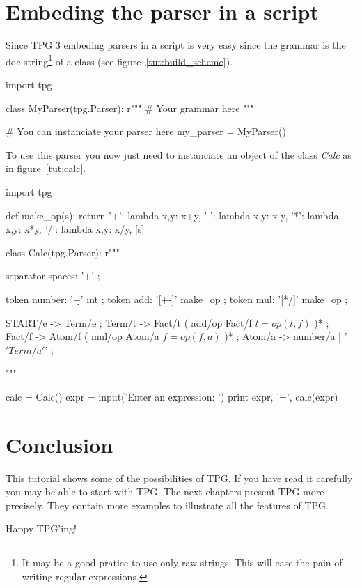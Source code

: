 \section{Embeding the parser in a script}

Since TPG 3 embeding parsers in a script is very easy since the grammar is the doc string\footnote{It may be a good pratice to use only raw strings. This will ease the pain of writing regular expressions.} of a class (see figure~\ref{tut:build_scheme}).

\begin{code}
\caption{Writting TPG grammars in Python}             \label{tut:build_scheme}
\begin{verbatimtab}[4]
import tpg

class MyParser(tpg.Parser):
    r""" # Your grammar here """

# You can instanciate your parser here
my_parser = MyParser()
\end{verbatimtab}
\end{code}

To use this parser you now just need to instanciate an object of the class \emph{Calc} as in figure~\ref{tut:calc}.

\begin{code}
\caption{Complete Python script with expression parser}     \label{tut:calc}
\begin{verbatimtab}[4]
import tpg

def make_op(s):
    return {
        '+': lambda x,y: x+y,
        '-': lambda x,y: x-y,
        '*': lambda x,y: x*y,
        '/': lambda x,y: x/y,
    }[s]

class Calc(tpg.Parser):
    r"""

    separator spaces: '\s+' ;

    token number: '\d+' int ;
    token add: '[+-]' make_op ;
    token mul: '[*/]' make_op ;

    START/e -> Term/e ;
    Term/t -> Fact/t ( add/op Fact/f $t=op(t,f)$ )* ;
    Fact/f -> Atom/f ( mul/op Atom/a $f=op(f,a)$ )* ;
    Atom/a -> number/a | '\(' Term/a '\)' ;

    """

calc = Calc()
expr = input('Enter an expression: ')
print expr, '=', calc(expr)
\end{verbatimtab}
\end{code}

\clearpage

\section{Conclusion}

This tutorial shows some of the possibilities of TPG.
If you have read it carefully you may be able to start with TPG.
The next chapters present TPG more precisely.
They contain more examples to illustrate all the features of TPG.

Happy TPG'ing!
